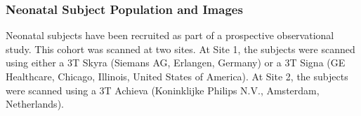 





\subsubsection{Neonatal Subject Population and Images}

Neonatal subjects have been recruited as part of a prospective observational study. This cohort was scanned at two sites. At Site 1, the subjects were scanned using either a 3T Skyra (Siemans AG, Erlangen, Germany) or a 3T Signa (GE Healthcare, Chicago, Illinois, United States of America). At Site 2, the subjects were scanned using a 3T Achieva (Koninklijke Philips N.V., Amsterdam, Netherlands).

